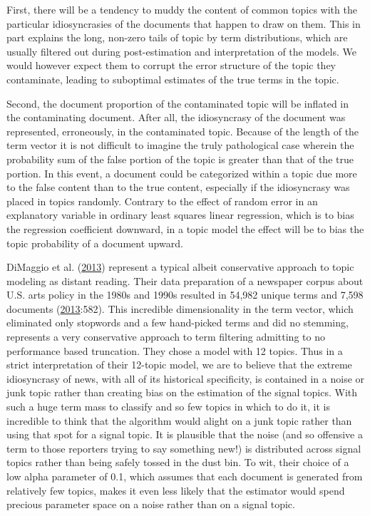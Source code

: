 \documentclass[]{book}
\theoremstyle{definition}
\theoremstyle{definition}
\theoremstyle{definition}
\theoremstyle{remark}
\begin{document}
First, there will be a tendency to muddy the content of common topics
with the particular idiosyncrasies of the documents that happen to draw
on them. This in part explains the long, non-zero tails of topic by term
distributions, which are usually filtered out during post-estimation and
interpretation of the models. We would however expect them to corrupt
the error structure of the topic they contaminate, leading to suboptimal
estimates of the true terms in the topic.

Second, the document proportion of the contaminated topic will be
inflated in the contaminating document. After all, the idiosyncrasy of
the document was represented, erroneously, in the contaminated topic.
Because of the length of the term vector it is not difficult to imagine
the truly pathological case wherein the probability sum of the false
portion of the topic is greater than that of the true portion. In this
event, a document could be categorized within a topic due more to the
false content than to the true content, especially if the idiosyncrasy
was placed in topics randomly. Contrary to the effect of random error in
an explanatory variable in ordinary least squares linear regression,
which is to bias the regression coefficient downward, in a topic model
the effect will be to bias the topic probability of a document upward.

DiMaggio et al. (\protect\hyperlink{ref-DiMaggio2013Exploiting}{2013})
represent a typical albeit conservative approach to topic modeling as
distant reading. Their data preparation of a newspaper corpus about U.S.
arts policy in the 1980s and 1990s resulted in 54,982 unique terms and
7,598 documents
(\protect\hyperlink{ref-DiMaggio2013Exploiting}{2013}:582). This
incredible dimensionality in the term vector, which eliminated only
stopwords and a few hand-picked terms and did no stemming, represents a
very conservative approach to term filtering admitting to no performance
based truncation. They chose a model with 12 topics. Thus in a strict
interpretation of their 12-topic model, we are to believe that the
extreme idiosyncrasy of news, with all of its historical specificity, is
contained in a noise or junk topic rather than creating bias on the
estimation of the signal topics. With such a huge term mass to classify
and so few topics in which to do it, it is incredible to think that the
algorithm would alight on a junk topic rather than using that spot for a
signal topic. It is plausible that the noise (and so offensive a term to
those reporters trying to say something new!) is distributed across
signal topics rather than being safely tossed in the dust bin. To wit,
their choice of a low alpha parameter of 0.1, which assumes that each
document is generated from relatively few topics, makes it even less
likely that the estimator would spend precious parameter space on a
noise rather than on a signal topic.
\end{document}
